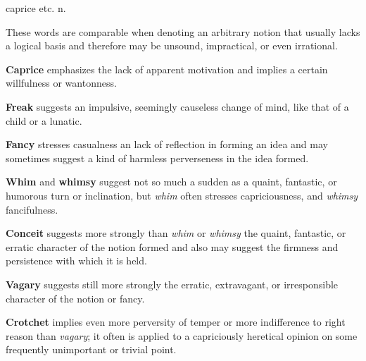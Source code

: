 \begin{description}[style=unboxed]
        {caprice etc.} n.
\begin{mynewitemize}
\item These words are comparable when denoting an arbitrary notion that
usually lacks a logical basis and therefore may be unsound, impractical,
or even irrational.
\item \textbf{Caprice} emphasizes the lack of apparent motivation and 
implies a certain willfulness or wantonness.
\item \textbf{Freak} suggests an impulsive, seemingly causeless change of
mind, like that of a child or a lunatic.
\item \textbf{Fancy} stresses casualness an lack of reflection in forming
an idea and may sometimes suggest a kind of harmless perverseness in the
idea formed.
\item \textbf{Whim} and \textbf{whimsy} suggest not so much a sudden as
a quaint, fantastic, or humorous turn or inclination, but \textit{whim}
often stresses capriciousness, and \textit{whimsy} fancifulness.
\item \textbf{Conceit} suggests more strongly than \textit{whim} or
\textit{whimsy} the quaint, fantastic, or erratic character of the notion
formed and also may suggest the firmness and persistence with which it
is held.
\item \textbf{Vagary} suggests still more strongly the erratic, extravagant,
or irresponsible character of the notion or fancy.
\item \textbf{Crotchet} implies even more perversity of temper or more 
indifference to right reason than \textit{vagary}; it often is applied 
to a capriciously heretical opinion on some frequently unimportant or
trivial point.
\end{mynewitemize}


\end{description}

